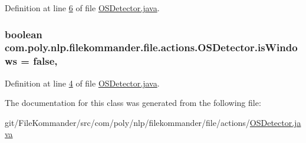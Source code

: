 Definition at line \hyperlink{L6}{6} of file \hyperlink{}{O\-S\-Detector.\-java}.

\hypertarget{classcom_1_1poly_1_1nlp_1_1filekommander_1_1file_1_1actions_1_1_o_s_detector_a79c0b2e4cc827207058a2bd69447964e}{
\subsubsection[{is\-Windows}]{\setlength{\rightskip}{0pt plus 5cm}boolean com.\-poly.\-nlp.\-filekommander.\-file.\-actions.\-O\-S\-Detector.\-is\-Windows = false\hspace{0.3cm}{\ttfamily [static]}, {\ttfamily [private]}}}\label{classcom_1_1poly_1_1nlp_1_1filekommander_1_1file_1_1actions_1_1_o_s_detector_a79c0b2e4cc827207058a2bd69447964e}


Definition at line \hyperlink{L4}{4} of file \hyperlink{}{O\-S\-Detector.\-java}.



The documentation for this class was generated from the following file\-:\begin{DoxyCompactItemize}
\item 
git/\-File\-Kommander/src/com/poly/nlp/filekommander/file/actions/\hyperlink{_o_s_detector_8java}{O\-S\-Detector.\-java}\end{DoxyCompactItemize}
